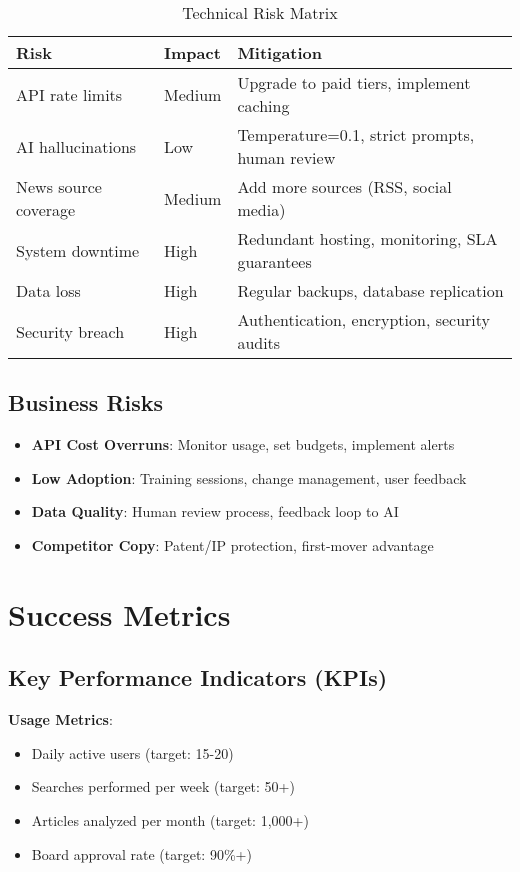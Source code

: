 \documentclass[11pt,a4paper]{article}
\begin{document}
\begin{table}[h]
\centering
\small
\begin{tabular}{@{}p{4cm}p{2cm}p{7cm}@{}}
\toprule
\textbf{Risk} & \textbf{Impact} & \textbf{Mitigation} \\ \midrule
API rate limits & Medium & Upgrade to paid tiers, implement caching \\
AI hallucinations & Low & Temperature=0.1, strict prompts, human review \\
News source coverage & Medium & Add more sources (RSS, social media) \\
System downtime & High & Redundant hosting, monitoring, SLA guarantees \\
Data loss & High & Regular backups, database replication \\
Security breach & High & Authentication, encryption, security audits \\
\bottomrule
\end{tabular}
\caption{Technical Risk Matrix}
\end{table}

\subsection{Business Risks}

\begin{itemize}[leftmargin=*]
    \item \textbf{API Cost Overruns}: Monitor usage, set budgets, implement alerts
    \item \textbf{Low Adoption}: Training sessions, change management, user feedback
    \item \textbf{Data Quality}: Human review process, feedback loop to AI
    \item \textbf{Competitor Copy}: Patent/IP protection, first-mover advantage
\end{itemize}

\section{Success Metrics}

\subsection{Key Performance Indicators (KPIs)}

\textbf{Usage Metrics}:
\begin{itemize}[leftmargin=*]
    \item Daily active users (target: 15-20)
    \item Searches performed per week (target: 50+)
    \item Articles analyzed per month (target: 1,000+)
    \item Board approval rate (target: 90\%+)
\end{itemize}
\end{document}
